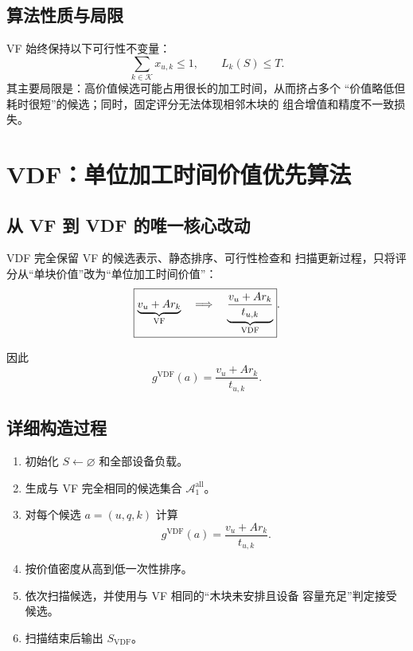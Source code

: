 \documentclass[UTF8,12pt,a4paper]{ctexart}
\newcommand{\Alg}[1]{\textsc{#1}}
\newcommand{\K}{\mathcal{K}}
\newcommand{\Aone}{\mathcal{A}_{1}}
\newcommand{\score}{g}
\newcommand{\load}{L}
\begin{document}
\subsection{算法性质与局限}

\Alg{VF} 始终保持以下可行性不变量：
\[
\sum_{k\in\K}x_{u,k}\leq1,
\qquad
\load_k(S)\leq T.
\]
其主要局限是：高价值候选可能占用很长的加工时间，从而挤占多个
“价值略低但耗时很短”的候选；同时，固定评分无法体现相邻木块的
组合增值和精度不一致损失。

\section{\Alg{VDF}：单位加工时间价值优先算法}

\subsection{从 \Alg{VF} 到 \Alg{VDF} 的唯一核心改动}

\Alg{VDF} 完全保留 \Alg{VF} 的候选表示、静态排序、可行性检查和
扫描更新过程，只将评分从“单块价值”改为“单位加工时间价值”：
\[
\boxed{
\underbrace{v_u+A r_k}_{\Alg{VF}}
\quad\Longrightarrow\quad
\underbrace{
\frac{v_u+A r_k}{t_{u,k}}
}_{\Alg{VDF}}
}.
\]

因此
\[
\boxed{
\score^{\mathrm{VDF}}(a)
=
\frac{v_u+A r_k}{t_{u,k}}
}.
\]

\subsection{详细构造过程}

\begin{enumerate}
  \item 初始化 \(S\leftarrow\varnothing\) 和全部设备负载。
  \item 生成与 \Alg{VF} 完全相同的候选集合
        \(\Aone^{\mathrm{all}}\)。
  \item 对每个候选 \(a=(u,q,k)\) 计算
        \[
        \score^{\mathrm{VDF}}(a)
        =
        \frac{v_u+A r_k}{t_{u,k}}.
        \]
  \item 按价值密度从高到低一次性排序。
  \item 依次扫描候选，并使用与 \Alg{VF} 相同的“木块未安排且设备
        容量充足”判定接受候选。
  \item 扫描结束后输出 \(S_{\mathrm{VDF}}\)。
\end{enumerate}
\end{document}
